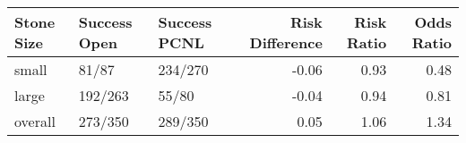\begin{table}[ht]
\centering
\begin{tabular}{lllrrr}
  \toprule
{\textbf{Stone Size}} & {\textbf{Success Open}} & {\textbf{Success PCNL}} & {\textbf{Risk Difference}} & {\textbf{Risk Ratio}} & {\textbf{Odds Ratio}} \\ 
  \midrule
small & 81/87 & 234/270 & -0.06 & 0.93 & 0.48 \\ 
  large & 192/263 & 55/80 & -0.04 & 0.94 & 0.81 \\ 
  overall & 273/350 & 289/350 & 0.05 & 1.06 & 1.34 \\ 
   \bottomrule
\end{tabular}
\end{table}
